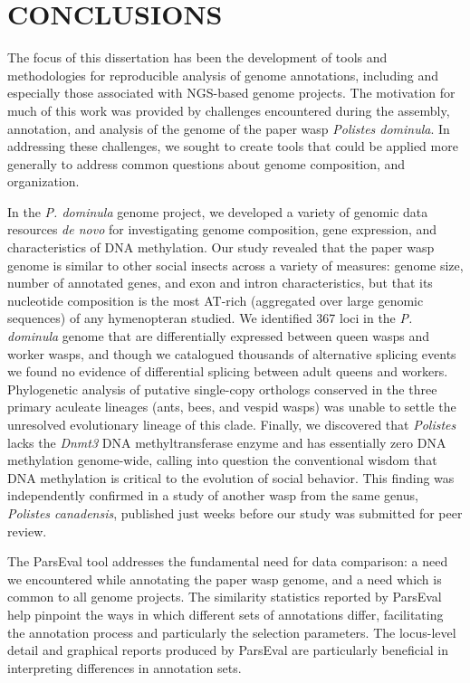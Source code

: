\chapter{CONCLUSIONS}

The focus of this dissertation has been the development of tools and methodologies for reproducible analysis of genome annotations, including and especially those associated with NGS-based genome projects.
The motivation for much of this work was provided by challenges encountered during the assembly, annotation, and analysis of the genome of the paper wasp \textit{Polistes dominula}.
In addressing these challenges, we sought to create tools that could be applied more generally to address common questions about genome composition, and organization.

In the \textit{P. dominula} genome project, we developed a variety of genomic data resources \textit{de novo} for investigating genome composition, gene expression, and characteristics of DNA methylation.
Our study revealed that the paper wasp genome is similar to other social insects across a variety of measures: genome size, number of annotated genes, and exon and intron characteristics, but that its nucleotide composition is the most AT-rich (aggregated over large genomic sequences) of any hymenopteran studied.
We identified 367 loci in the \textit{P. dominula} genome that are differentially expressed between queen wasps and worker wasps, and though we catalogued thousands of alternative splicing events we found no evidence of differential splicing between adult queens and workers.
Phylogenetic analysis of putative single-copy orthologs conserved in the three primary aculeate lineages (ants, bees, and vespid wasps) was unable to settle the unresolved evolutionary lineage of this clade.
Finally, we discovered that \textit{Polistes} lacks the \textit{Dnmt3} DNA methyltransferase enzyme and has essentially zero DNA methylation genome-wide, calling into question the conventional wisdom that DNA methylation is critical to the evolution of social behavior.
This finding was independently confirmed in a study of another wasp from the same genus, \textit{Polistes canadensis}, published just weeks before our study was submitted for peer review.

The ParsEval tool addresses the fundamental need for data comparison: a need we encountered while annotating the paper wasp genome, and a need which is common to all genome projects.
The similarity statistics reported by ParsEval help pinpoint the ways in which different sets of annotations differ, facilitating the annotation process and particularly the selection parameters.
The locus-level detail and graphical reports produced by ParsEval are particularly beneficial in interpreting differences in annotation sets.

